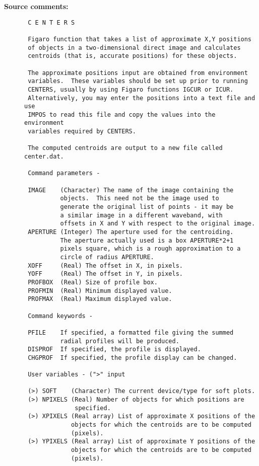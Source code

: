 \begin{description}
\item [{\bf Source comments:}]
\begin{verbatim}
 C E N T E R S

 Figaro function that takes a list of approximate X,Y positions
 of objects in a two-dimensional direct image and calculates
 centroids (that is, accurate positions) for these objects.

 The approximate positions input are obtained from environment
 variables.  These variables should be set up prior to running
 CENTERS, usually by using Figaro functions IGCUR or ICUR.
 Alternatively, you may enter the positions into a text file and use
 IMPOS to read this file and copy the values into the environment
 variables required by CENTERS.

 The computed centroids are output to a new file called center.dat.

 Command parameters -

 IMAGE    (Character) The name of the image containing the
          objects.  This need not be the image used to
          generate the original list of points - it may be
          a similar image in a different waveband, with
          offsets in X and Y with respect to the original image.
 APERTURE (Integer) The aperture used for the centroiding.
          The aperture actually used is a box APERTURE*2+1
          pixels square, which is a rough approximation to a
          circle of radius APERTURE.
 XOFF     (Real) The offset in X, in pixels.
 YOFF     (Real) The offset in Y, in pixels.
 PROFBOX  (Real) Size of profile box.
 PROFMIN  (Real) Minimum displayed value.
 PROFMAX  (Real) Maximum displayed value.

 Command keywords -

 PFILE    If specified, a formatted file giving the summed
          radial profiles will be produced.
 DISPROF  If specified, the profile is displayed.
 CHGPROF  If specified, the profile display can be changed.

 User variables - (">" input

 (>) SOFT    (Character) The current device/type for soft plots.
 (>) NPIXELS (Real) Number of objects for which positions are
              specified.
 (>) XPIXELS (Real array) List of approximate X positions of the
             objects for which the centroids are to be computed
             (pixels).
 (>) YPIXELS (Real array) List of approximate Y positions of the
             objects for which the centroids are to be computed
             (pixels).


\end{verbatim}
\end{description}
